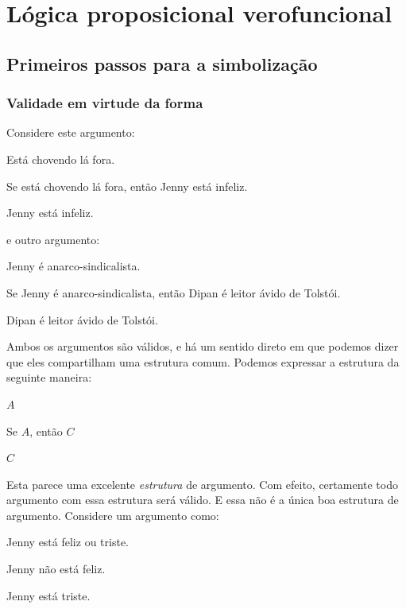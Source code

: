 \part{Lógica proposicional verofuncional}
\label{ch.TFL}

\chapter{Primeiros passos para a simbolização}

\section{Validade em virtude da forma}\label{s:ValidityInVirtueOfForm}
Considere este argumento:
	\begin{earg}
		\item[] Está chovendo lá fora.
		\item[] Se está chovendo lá fora, então Jenny está infeliz.
		\item[\texttherefore] Jenny está infeliz.
	\end{earg}
e outro argumento:
	\begin{earg}
		\item[] Jenny é anarco-sindicalista.
		\item[] Se Jenny é anarco-sindicalista, então Dipan é leitor ávido de Tolstói.
		\item[\texttherefore] Dipan é leitor ávido de Tolstói.
	\end{earg}
Ambos os argumentos são válidos, e há um sentido direto em que podemos dizer que eles compartilham uma estrutura comum. Podemos expressar a estrutura da seguinte maneira:
	\begin{earg}
		\item[] $A$
		\item[] Se $A$, então $C$
		\item[\texttherefore] $C$
	\end{earg}
Esta parece uma excelente \emph{estrutura} de argumento. Com efeito, certamente todo argumento com essa estrutura será válido. E essa não é a única boa estrutura de argumento. Considere um argumento como:
	\begin{earg}
		\item[] Jenny está feliz ou triste.
		\item[] Jenny não está feliz.
		\item[\texttherefore] Jenny está triste.
	\end{earg}
